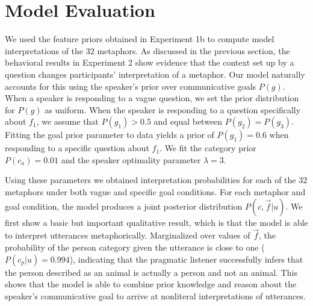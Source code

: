 \documentclass[10pt,letterpaper]{article}
\begin{document}
\section{Model Evaluation}
We used the feature priors obtained in Experiment 1b to compute model interpretations of the $32$ metaphors. As discussed in the previous section, the behavioral results in Experiment 2 show evidence that the context set up by a question changes participants' interpretation of a metaphor. Our model naturally accounts for this using the speaker's prior over communicative goals $P(g)$. When a speaker is responding to a vague question, we set the prior distribution for $P(g)$ as uniform. When the speaker is responding to a question specifically about $f_1$, we assume that $P(g_1) > 0.5$ and equal between $P(g_2) = P(g_3)$. Fitting the goal prior parameter to data yields a prior of $P(g_1) = 0.6$ when responding to a specific question about $f_1$. We fit the category prior $P(c_a) = 0.01$ and the speaker optimality parameter $\lambda = 3$. %

Using these parameters we obtained interpretation probabilities for each of the $32$ metaphors under both vague and specific goal conditions. For each metaphor and goal condition, the model produces a joint posterior distribution $P(c, \vec f | u)$. We first show a basic but important qualitative result, which is that the model is able to interpret utterances metaphorically. Marginalized over values of $\vec f$, the probability of the person category given the utterance is close to one ($P(c_p | u) = 0.994$), indicating that the pragmatic listener successfully infers that the person described as an animal is actually a person and not an animal. This shows that the model is able to combine prior knowledge and reason about the speaker's communicative goal to arrive at nonliteral interpretations of utterances.

\end{document}
